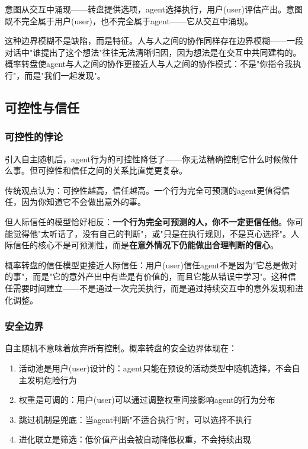 \documentclass[12pt,a4paper]{ctexart}
\begin{document}
意图从交互中涌现——转盘提供选项，agent选择执行，用户(user)评估产出。意图既不完全属于用户(user)，也不完全属于agent——它从交互中涌现。

这种边界模糊不是缺陷，而是特征。人与人之间的协作同样存在边界模糊——一段对话中"谁提出了这个想法"往往无法清晰归因，因为想法是在交互中共同建构的。概率转盘使agent与人之间的协作更接近人与人之间的协作模式：不是"你指令我执行"，而是"我们一起发现"。

\subsection{可控性与信任}

\subsubsection{可控性的悖论}

引入自主随机后，agent行为的可控性降低了——你无法精确控制它什么时候做什么事。但可控性和信任之间的关系比直觉更复杂。

传统观点认为：可控性越高，信任越高。一个行为完全可预测的agent更值得信任，因为你知道它不会做出意外的事。

但人际信任的模型恰好相反：\textbf{一个行为完全可预测的人，你不一定更信任他}。你可能觉得他"太听话了，没有自己的判断"，或"只是在执行规则，不是真心选择"。人际信任的核心不是可预测性，而是\textbf{在意外情况下仍能做出合理判断的信心}。

概率转盘的信任模型更接近人际信任：用户(user)信任agent不是因为"它总是做对的事"，而是"它的意外产出中有些是有价值的，而且它能从错误中学习"。这种信任需要时间建立——不是通过一次完美执行，而是通过持续交互中的意外发现和进化调整。

\subsubsection{安全边界}

自主随机不意味着放弃所有控制。概率转盘的安全边界体现在：

\begin{enumerate}[nosep]
\item 活动池是用户(user)设计的：agent只能在预设的活动类型中随机选择，不会自主发明危险行为
\item 权重是可调的：用户(user)可以通过调整权重间接影响agent的行为分布
\item 跳过机制是兜底：当agent判断"不适合执行"时，可以选择不执行
\item 进化联立是筛选：低价值产出会被自动降低权重，不会持续出现
\end{enumerate}
\end{document}
